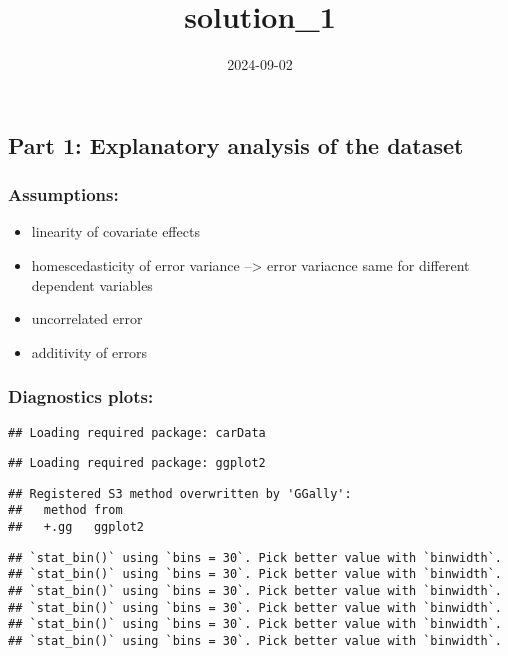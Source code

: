 \documentclass[
]{article}
\title{solution\_1}
\author{}
\date{\vspace{-2.5em}2024-09-02}
\providecommand{\tightlist}{%
  \setlength{\itemsep}{0pt}\setlength{\parskip}{0pt}}
\begin{document}
\maketitle

\hypertarget{part-1-explanatory-analysis-of-the-dataset}{%
\subsection{Part 1: Explanatory analysis of the
dataset}\label{part-1-explanatory-analysis-of-the-dataset}}

\hypertarget{assumptions}{%
\subsubsection{Assumptions:}\label{assumptions}}

\begin{itemize}
\tightlist
\item
  linearity of covariate effects
\item
  homescedasticity of error variance --\textgreater{} error variacnce
  same for different dependent variables
\item
  uncorrelated error
\item
  additivity of errors
\end{itemize}

\hypertarget{diagnostics-plots}{%
\subsubsection{Diagnostics plots:}\label{diagnostics-plots}}

\begin{verbatim}
## Loading required package: carData
\end{verbatim}

\begin{verbatim}
## Loading required package: ggplot2
\end{verbatim}

\begin{verbatim}
## Registered S3 method overwritten by 'GGally':
##   method from   
##   +.gg   ggplot2
\end{verbatim}

\begin{verbatim}
## `stat_bin()` using `bins = 30`. Pick better value with `binwidth`.
## `stat_bin()` using `bins = 30`. Pick better value with `binwidth`.
## `stat_bin()` using `bins = 30`. Pick better value with `binwidth`.
## `stat_bin()` using `bins = 30`. Pick better value with `binwidth`.
## `stat_bin()` using `bins = 30`. Pick better value with `binwidth`.
## `stat_bin()` using `bins = 30`. Pick better value with `binwidth`.
\end{verbatim}
\end{document}
